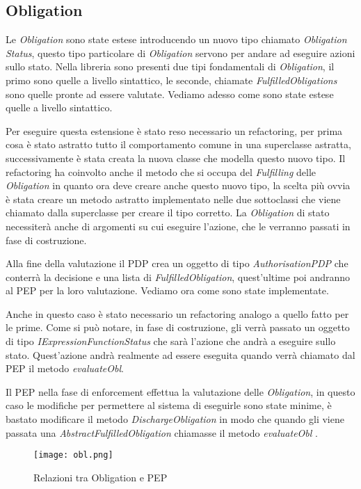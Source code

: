 \subsection{Obligation}
\label{sub:estensione_obligation}
Le \textit{Obligation} sono state estese introducendo un nuovo tipo chiamato \textit{Obligation Status}, questo tipo particolare di \textit{Obligation} servono per andare ad eseguire azioni sullo stato.
Nella libreria sono presenti due tipi fondamentali di \textit{Obligation}, il primo sono quelle a livello sintattico, le seconde, chiamate \textit{FulfilledObligations} sono quelle pronte ad essere valutate. Vediamo adesso come sono state estese quelle a livello sintattico. \par
Per eseguire questa estensione è stato reso necessario un refactoring, per prima cosa è stato astratto tutto il comportamento comune in una superclasse astratta, successivamente è stata creata la nuova classe che modella questo nuovo tipo.
Il refactoring ha coinvolto anche il metodo che si occupa del \textit{Fulfilling} delle \textit{Obligation} in quanto ora deve creare anche questo nuovo tipo, la scelta più ovvia è stata creare un metodo astratto implementato nelle due sottoclassi che viene chiamato dalla superclasse per creare il tipo corretto.
La \textit{Obligation} di stato necessiterà anche di argomenti su cui eseguire l'azione, che le verranno passati in fase di costruzione. \par
Alla fine della valutazione il \ac{PDP} crea un oggetto di tipo \textit{AuthorisationPDP} che conterrà la decisione e una lista di \textit{FulfilledObligation}, quest'ultime poi andranno al \ac{PEP} per la loro valutazione. Vediamo ora come sono state implementate. \par
Anche in questo caso è stato necessario un refactoring analogo a quello fatto per le prime.
Come si può notare, in fase di costruzione, gli verrà passato un oggetto di tipo \textit{IExpressionFunctionStatus} che sarà l'azione che andrà a eseguire sullo stato. Quest'azione andrà realmente ad essere eseguita quando verrà chiamato dal \ac{PEP} il metodo \textit{evaluateObl}. \par
Il \ac{PEP} nella fase di enforcement effettua la valutazione delle \textit{Obligation}, in questo caso le modifiche per permettere al sistema di eseguirle sono state minime, è bastato modificare il metodo \textit{DischargeObligation} in modo che quando gli viene passata una \textit{AbstractFulfilledObligation} chiamasse il metodo \textit{evaluateObl} .
\begin{sidewaysfigure}[H]
    \centering
	\texttt{[image: obl.png]}
    \caption{Relazioni tra Obligation e PEP}
    \label{fig:obl.png}
\end{sidewaysfigure}





